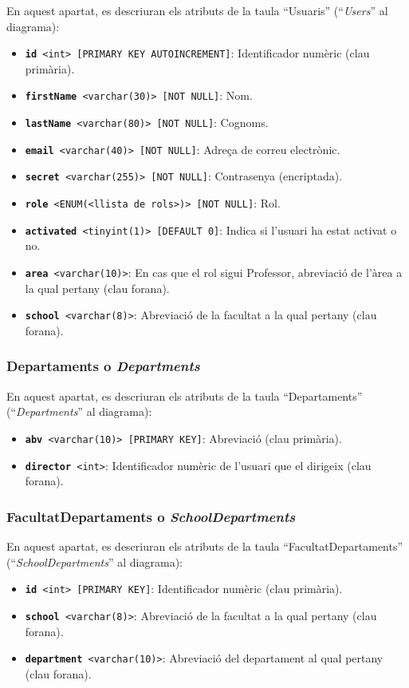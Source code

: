 \documentclass[a4paper,12pt]{ThesisStyle}
\begin{document}
En aquest apartat, es descriuran els atributs de la taula ``Usuaris'' (``\textit{Users}'' al diagrama):
\begin{itemize}
  \item \texttt{\textbf{id} <int> [PRIMARY KEY AUTOINCREMENT]}: Identificador numèric (clau primària).
  \item \texttt{\textbf{firstName} <varchar(30)> [NOT NULL]}: Nom.
  \item \texttt{\textbf{lastName} <varchar(80)> [NOT NULL]}: Cognoms.
  \item \texttt{\textbf{email} <varchar(40)> [NOT NULL]}: Adreça de correu electrònic.
  \item \texttt{\textbf{secret} <varchar(255)> [NOT NULL]}: Contrasenya (encriptada).
  \item \texttt{\textbf{role} <ENUM(<llista de rols>)> [NOT NULL]}: Rol.
  \item \texttt{\textbf{activated} <tinyint(1)> [DEFAULT 0]}: Indica si l'usuari ha estat activat o no.
  \item \texttt{\textbf{area} <varchar(10)>}: En cas que el rol sigui Professor, abreviació de l'àrea a la qual pertany (clau forana).
  \item \texttt{\textbf{school} <varchar(8)>}: Abreviació de la facultat a la qual pertany (clau forana).
\end{itemize}

\subsubsection{Departaments o \textit{Departments}}

En aquest apartat, es descriuran els atributs de la taula ``Departaments'' (``\textit{Departments}'' al diagrama):
\begin{itemize}
  \item \texttt{\textbf{abv} <varchar(10)> [PRIMARY KEY]}: Abreviació (clau primària).
  \item \texttt{\textbf{director} <int>}: Identificador numèric de l'usuari que el dirigeix (clau forana).
\end{itemize}

\subsubsection{FacultatDepartaments o \textit{SchoolDepartments}}

En aquest apartat, es descriuran els atributs de la taula ``FacultatDepartaments'' (``\textit{SchoolDepartments}'' al diagrama):
\begin{itemize}
  \item \texttt{\textbf{id} <int> [PRIMARY KEY]}: Identificador numèric (clau primària).
  \item \texttt{\textbf{school} <varchar(8)>}: Abreviació de la facultat a la qual pertany (clau forana).
  \item \texttt{\textbf{department} <varchar(10)>}: Abreviació del departament al qual pertany (clau forana).
\end{itemize}
\end{document}
